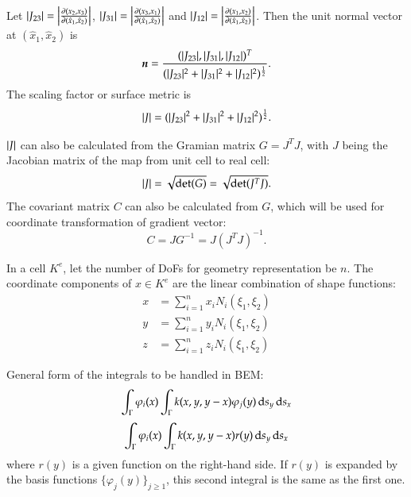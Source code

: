 \documentclass[11pt, a4paper]{book}
\begin{document}
Let $\lvert J_{23}\rvert = \left\vert \frac{\partial (x_2,x_3)}{\partial (\hat{x}_1,\hat{x}_2)}\right\vert$,
$\lvert J_{31}\rvert = \left\vert \frac{\partial (x_3,x_1)}{\partial (\hat{x}_1,\hat{x}_2)}\right\vert$ and
$\lvert J_{12}\rvert = \left\vert \frac{\partial (x_1,x_2)}{\partial (\hat{x}_1,\hat{x}_2)}\right\vert$. Then
the unit normal vector at $(\hat{x}_1,\hat{x}_2)$ is
\begin{equation}
  \label{eq:surface-normal-vector}
  \boldsymbol{n} = \frac{(\lvert J_{23}\rvert,\lvert J_{31}\rvert,\lvert J_{12}\rvert)^T}{(\lvert J_{23}\rvert^2+\lvert J_{31}\rvert^2+\lvert J_{12}\rvert^2)^{\frac{1}{2}}}.
\end{equation}
The scaling factor or surface metric is
\begin{equation}
  \label{eq:surface-metric}
  \lvert J\rvert = (\lvert J_{23}\rvert^2+\lvert J_{31}\rvert^2+\lvert J_{12}\rvert^2)^{\frac{1}{2}}.
\end{equation}

$\lvert J\rvert$ can also be calculated from the Gramian matrix $G = J^TJ$, with $J$ being the
Jacobian matrix of the map from unit cell to real cell:
\begin{equation}
  \label{eq:surface-metric-from-gramian-matrix}
  \lvert J\rvert = \sqrt{\det(G)} = \sqrt{\det(J^TJ)}.
\end{equation}
The covariant matrix $C$ can also be calculated from $G$, which will be used for
coordinate transformation of gradient vector:
\begin{equation}
  \label{eq:covariant-matrix}
  C = J G^{-1} = J(J^TJ)^{-1}.
\end{equation}

In a cell $K^e$, let the number of DoFs for geometry representation be $n$. The coordinate
components of $x\in K^e$ are the linear combination of shape functions:
\begin{equation}
  \begin{split}
    x &= \sum_{i=1}^n x_iN_i(\xi_1,\xi_2) \\
    y &= \sum_{i=1}^n y_iN_i(\xi_1,\xi_2) \\
    z &= \sum_{i=1}^n z_iN_i(\xi_1,\xi_2)
  \end{split}
\end{equation}

General form of the integrals to be handled in BEM:
\begin{equation}
  \int_{\Gamma} \varphi_i(x) \int_{\Gamma}k(x,y,y-x) \varphi_j(y) \,\mathrm{d} s_y \,\mathrm{d} s_x
\end{equation}
\begin{equation}
  \int_{\Gamma}\varphi_i(x)\int_{\Gamma}k(x,y,y-x)r(y) \,\mathrm{d} s_y \,\mathrm{d} s_x
\end{equation}
where $r(y)$ is a given function on the right-hand side. If $r(y)$ is expanded by the basis
functions $\{\varphi_j(y)\}_{j\geq 1}$, this second integral is the same as the first one.
\end{document}
